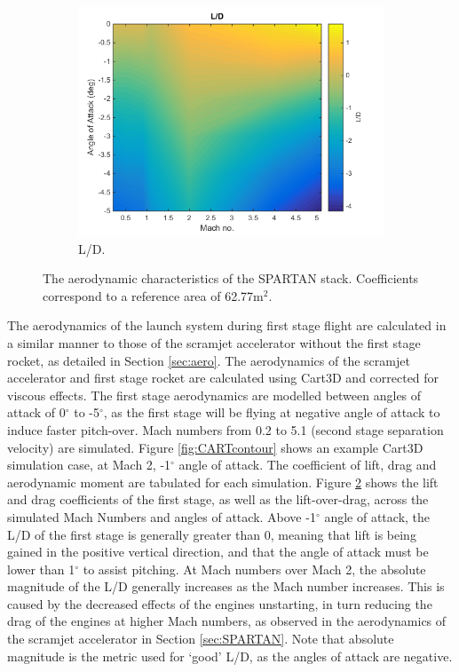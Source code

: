 \begin{figure}[ht]
\begin{subfigure}{.5\textwidth}
    		\centering
    		\includegraphics[width=0.99\linewidth]{figures/3_vehicle_design/FirstStageLD}
    		\caption{L/D.}
    		\label{fig:LD-EFirstStage}
    	\end{subfigure}
    	\caption{The aerodynamic characteristics of the SPARTAN stack.  Coefficients correspond to a reference area of 62.77m$^2$.}
    	\label{fig:FirstStageAero}
    \end{figure}
  The aerodynamics of the launch system during first stage flight are calculated in a similar manner to those of the scramjet accelerator without the first stage rocket, as detailed in Section \ref{sec:aero}. 
  The aerodynamics of the scramjet accelerator and first stage rocket are calculated using Cart3D and corrected for viscous effects. The first stage aerodynamics are modelled between angles of attack of 0$^\circ$ to -5$^\circ$, as the first stage will be flying at negative angle of attack to induce faster pitch-over. Mach numbers from 0.2 to 5.1 (second stage separation velocity) are simulated. Figure \ref{fig:CARTcontour} shows an example Cart3D simulation case, at Mach 2, -1$^\circ$ angle of attack. The coefficient of lift, drag and aerodynamic moment are tabulated for each simulation. Figure \ref{fig:FirstStageAero} shows the lift and drag coefficients of the first stage, as well as the lift-over-drag, across the simulated Mach Numbers and angles of attack. Above -1$^\circ$ angle of attack, the L/D of the first stage is generally greater than 0, meaning that lift is being gained in the positive vertical direction, and that the angle of attack must be lower than 1$^\circ$ to assist pitching.
  At Mach numbers over Mach 2, the absolute magnitude of the L/D generally increases as the Mach number increases. This is caused by the decreased effects of the engines unstarting, in turn reducing the drag of the engines at higher Mach numbers, as observed in the aerodynamics of the scramjet accelerator in Section \ref{sec:SPARTAN}. 
   Note that absolute magnitude is the metric used for `good' L/D, as the angles of attack are negative. 
  
